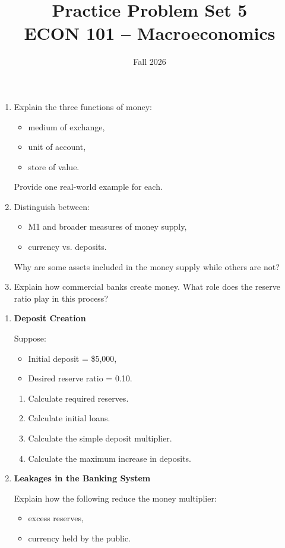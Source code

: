 \documentclass[12pt]{article}
\title{Practice Problem Set 5\\ \vspace{10pt} \large ECON 101 -- Macroeconomics}
\author{}
\date{ \vspace{-30pt} Fall 2026}
\begin{document}
\maketitle



\begin{enumerate}[label=\textbf{\arabic*.}]

\item Explain the three functions of money:
\begin{itemize}
    \item medium of exchange,
    \item unit of account,
    \item store of value.
\end{itemize}
Provide one real-world example for each.

\item Distinguish between:
\begin{itemize}
    \item M1 and broader measures of money supply,
    \item currency vs. deposits.
\end{itemize}
Why are some assets included in the money supply while others are not?

\item Explain how commercial banks create money. 
What role does the reserve ratio play in this process?

\end{enumerate}



\begin{enumerate}[label=\textbf{\arabic*.}, start=4]

\item \textbf{Deposit Creation}

Suppose:
\begin{itemize}
    \item Initial deposit = \$5,000,
    \item Desired reserve ratio = 0.10.
\end{itemize}

\begin{enumerate}
    \item[(a)] Calculate required reserves.
    \item[(b)] Calculate initial loans.
    \item[(c)] Calculate the simple deposit multiplier.
    \item[(d)] Calculate the maximum increase in deposits.
\end{enumerate}

\item \textbf{Leakages in the Banking System}

Explain how the following reduce the money multiplier:
\begin{itemize}
    \item excess reserves,
    \item currency held by the public.
\end{itemize}

\end{enumerate}
\end{document}
